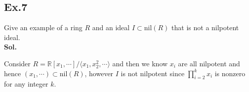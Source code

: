 \documentclass[lang=en,11pt,a4paper,citestyle =authoryear]{elegantpaper}
\begin{document}
\subsection*{Ex.7} 
Give an example of a ring $R$ and an ideal $I\subset\text{nil}(R)$ that is not a nilpotent ideal.
\vspace{0.5em}\\
\textbf{Sol.} \par
    Consider $R = \mathbb{R}[x_1,\cdots]/\langle x_1,x_2^2,\cdots\rangle$
    and then we know $x_i$ are all nilpotent and hence $(x_1,\cdots)\subset \text{nil}(R)$, however $I$ is not nilpotent since $\prod_{i=2}^k x_i$ is nonzero for any integer $k$. 
\vspace{0.5em}


\addappheadtotoc
\end{document}
